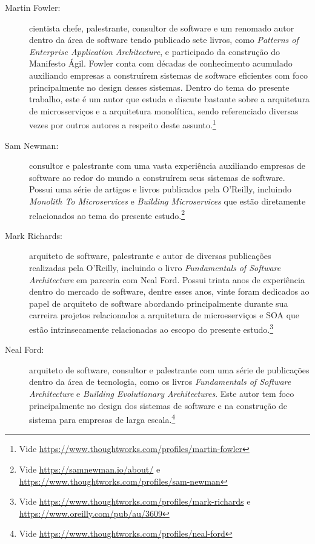 \begin{description}
    \item[Martin Fowler:] cientista chefe, palestrante, consultor de software e um
        renomado autor dentro da área de software tendo publicado sete livros, como \textit{Patterns of Enterprise
        Application Architecture}, e participado da construção do Manifesto Ágil. Fowler conta com
        décadas de conhecimento acumulado auxiliando empresas a construírem sistemas de software
        eficientes com foco principalmente no design desses sistemas. Dentro do tema do presente
        trabalho, este é um autor que estuda e discute bastante sobre a arquitetura de
        microsserviços e a arquitetura monolítica, sendo referenciado diversas vezes por outros
        autores a respeito deste assunto.\footnote{Vide \url{https://www.thoughtworks.com/profiles/martin-fowler}}
    \item[Sam Newman:] consultor e palestrante com uma vasta experiência auxiliando
        empresas de software ao redor do mundo a construírem seus sistemas de software. Possui uma
        série de artigos e livros publicados pela O’Reilly, incluindo \textit{Monolith To
        Microservices} e \textit{Building Microservices} que estão diretamente relacionados ao tema
        do presente estudo.\footnote{Vide \url{https://samnewman.io/about/} e
        \url{https://www.thoughtworks.com/profiles/sam-newman}}
    \item[Mark Richards:] arquiteto de software, palestrante e autor de diversas
        publicações realizadas pela O’Reilly, incluindo o livro \textit{Fundamentals of Software
        Architecture} em parceria com Neal Ford.
        Possui trinta anos de experiência dentro do mercado de
        software, dentre esses anos, vinte foram dedicados ao papel de arquiteto de software
        abordando principalmente durante sua carreira projetos relacionados a arquitetura de
        microsserviços e \gls{SOA} que estão intrinsecamente relacionadas ao escopo do presente
        estudo.\footnote{Vide \url{https://www.thoughtworks.com/profiles/mark-richards} e
        \url{https://www.oreilly.com/pub/au/3609}}
    \item[Neal Ford:] arquiteto de software, consultor e palestrante com uma série de
        publicações dentro da área de tecnologia, como os livros \textit{ Fundamentals of Software
        Architecture} e \textit{Building Evolutionary Architectures}. Este autor tem foco
        principalmente no design dos sistemas de software e na construção de sistema para empresas
        de larga escala.\footnote{Vide \url{https://www.thoughtworks.com/profiles/neal-ford}}
\end{description}

